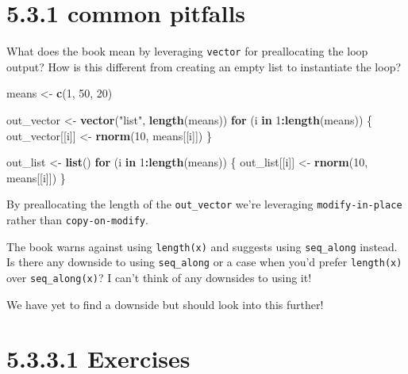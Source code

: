 \documentclass[]{book}
\newenvironment{Shaded}{\begin{snugshade}}{\end{snugshade}}
\newcommand{\ControlFlowTok}[1]{\textcolor[rgb]{0.13,0.29,0.53}{\textbf{#1}}}
\newcommand{\DecValTok}[1]{\textcolor[rgb]{0.00,0.00,0.81}{#1}}
\newcommand{\KeywordTok}[1]{\textcolor[rgb]{0.13,0.29,0.53}{\textbf{#1}}}
\newcommand{\NormalTok}[1]{#1}
\newcommand{\OperatorTok}[1]{\textcolor[rgb]{0.81,0.36,0.00}{\textbf{#1}}}
\newcommand{\StringTok}[1]{\textcolor[rgb]{0.31,0.60,0.02}{#1}}
\begin{document}
\hypertarget{common-pitfalls}{%
\section*{5.3.1 common pitfalls}\label{common-pitfalls}}

What does the book mean by leveraging \texttt{vector} for preallocating the loop output? How is this different from creating an empty list to instantiate the loop?

\begin{Shaded}
\begin{Highlighting}[]
\NormalTok{means <-}\StringTok{ }\KeywordTok{c}\NormalTok{(}\DecValTok{1}\NormalTok{, }\DecValTok{50}\NormalTok{, }\DecValTok{20}\NormalTok{)}

\NormalTok{out_vector <-}\StringTok{ }\KeywordTok{vector}\NormalTok{(}\StringTok{"list"}\NormalTok{, }\KeywordTok{length}\NormalTok{(means))}
\ControlFlowTok{for}\NormalTok{ (i }\ControlFlowTok{in} \DecValTok{1}\OperatorTok{:}\KeywordTok{length}\NormalTok{(means)) \{}
\NormalTok{  out_vector[[i]] <-}\StringTok{ }\KeywordTok{rnorm}\NormalTok{(}\DecValTok{10}\NormalTok{, means[[i]])}
\NormalTok{\}}

\NormalTok{out_list <-}\StringTok{ }\KeywordTok{list}\NormalTok{()}
\ControlFlowTok{for}\NormalTok{ (i }\ControlFlowTok{in} \DecValTok{1}\OperatorTok{:}\KeywordTok{length}\NormalTok{(means)) \{}
\NormalTok{  out_list[[i]] <-}\StringTok{ }\KeywordTok{rnorm}\NormalTok{(}\DecValTok{10}\NormalTok{, means[[i]])}
\NormalTok{\}}
\end{Highlighting}
\end{Shaded}

By preallocating the length of the \texttt{out\_vector} we're leveraging \texttt{modify-in-place} rather than \texttt{copy-on-modify}.

The book warns against using \texttt{length(x)} and suggests using \texttt{seq\_along} instead. Is there any downside to using \texttt{seq\_along} or a case when you'd prefer \texttt{length(x)} over \texttt{seq\_along(x)}? I can't think of any downsides to using it!

We have yet to find a downside but should look into this further!

\hypertarget{exercises-1}{%
\section*{5.3.3.1 Exercises}\label{exercises-1}}
\end{document}
